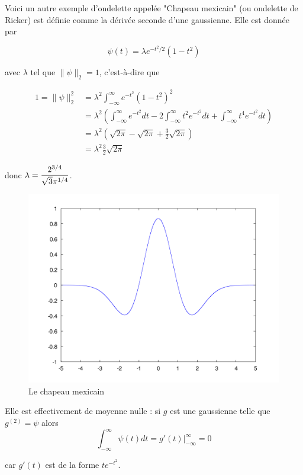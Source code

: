 	\begin{myexmpl}
		Voici un autre exemple d'ondelette appelée "Chapeau mexicain" (ou ondelette de Ricker) est définie comme la dérivée seconde d'une gaussienne. Elle est donnée par 
		
		$$\psi(t) = \lambda e^{-t^2/2} (1 - t^2)$$
		
		avec $\lambda$ tel que $\|\psi\|_2 = 1$, c'est-à-dire que
		
		\begin{align*}
			1 = \|\psi\|_2^2 &= \lambda^2 \int_{- \infty}^{\infty} e^{-t^2} (1-t^2)^2 \\
			&= \lambda^2 \left(\int_{-\infty}^{\infty} e^{-t^2} dt - 2 \int_{-\infty}^{\infty} t^2 e^{-t^2} dt + \int_{-\infty}^{\infty} t^4 e^{-t^2} dt\right) \\
			&= \lambda^2 \left(\sqrt{2 \pi} - \sqrt{2 \pi} + \frac{3}{2} \sqrt{2 \pi}\right) \\
			&= \lambda^2 \frac{3}{2} \sqrt{2 \pi}
		\end{align*}
		
		donc $\displaystyle \lambda = \frac{2^{3/4}}{\sqrt{3} \pi^{1/4}}$.
		
		\begin{figure}[h]
			\centering
			\includegraphics[width=350pt]{Pierre/Mexican_Hat.png}
			\caption{Le chapeau mexicain}
		\end{figure}
	
		Elle est effectivement de moyenne nulle : si $g$ est une gaussienne telle que $g^{(2)}= \psi$ alors $$\int_{-\infty}^{\infty} \psi(t) dt = g'(t) \bigg\vert_{-\infty}^{\infty} = 0$$

		car $g'(t)$ est de la forme $t e^{-t^2}$.
	\end{myexmpl}
	
